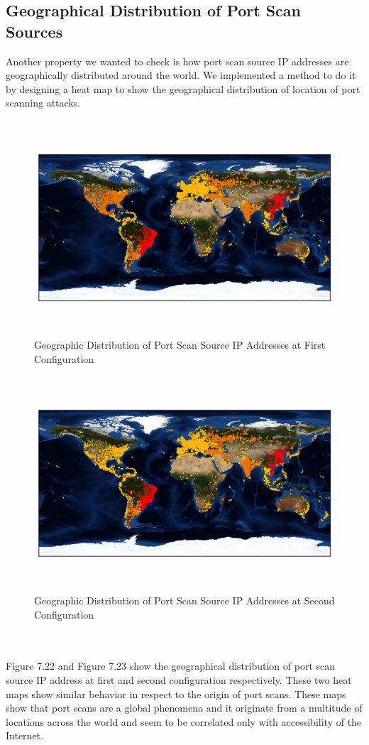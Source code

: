 \subsection{ Geographical Distribution of Port Scan Sources}
Another property we wanted to check is how port scan source IP addresses are geographically distributed around the world.
We implemented a method to do it by designing a heat map to show the geographical distribution of location of port scanning attacks.
\begin{figure}[p]
\centering
\includegraphics[width=14cm, height=8cm]{images/geographical_jan.png}
\caption{Geographic Distribution of Port Scan Source IP Addresses at First Configuration}
\end{figure}
\begin{figure}[p]
\centering
\includegraphics[width=14cm, height=8cm]{images/geographical_march.png}
\caption{Geographic Distribution of Port Scan Source IP Addresses at Second Configuration}
\end{figure}
\\\\ 
Figure 7.22 and Figure 7.23 show the geographical distribution of port scan source IP address at first and second configuration respectively.
These two heat maps show similar behavior in respect to the origin of port scans.
These maps show that port scans are a global phenomena and it originate from a multitude of locations across the world and seem to be correlated only with accessibility of the Internet. 
